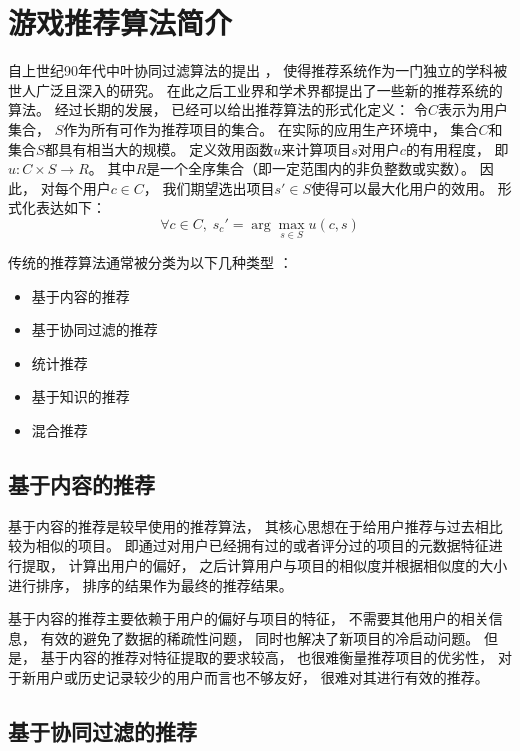 \section{游戏推荐算法简介}

自上世纪90年代中叶协同过滤算法的提出
\cite{adomaviciusNextGenerationRecommender2005}，
使得推荐系统作为一门独立的学科被世人广泛且深入的研究。
在此之后工业界和学术界都提出了一些新的推荐系统的算法。
经过长期的发展，
已经可以给出推荐算法的形式化定义：
令$C$表示为用户集合，
$S$作为所有可作为推荐项目的集合。
在实际的应用生产环境中，
集合$C$和集合$S$都具有相当大的规模。
定义效用函数$u$来计算项目$s$对用户$c$的有用程度，
即$u:C\times S\rightarrow R$。
其中$R$是一个全序集合（即一定范围内的非负整数或实数）。
因此，
对每个用户$c\in C$，
我们期望选出项目$s'\in S$使得可以最大化用户的效用。
形式化表达如下：
\begin{equation}
    \forall c\in C,\; s_c'=\arg \max_{s\in S} u(c,s)
\end{equation}

传统的推荐算法通常被分类为以下几种类型
\cite{canoHybridRecommenderSystems2017}：
\begin{itemize}
    \item 基于内容的推荐
    \item 基于协同过滤的推荐
    \item 统计推荐
    \item 基于知识的推荐
    \item 混合推荐
\end{itemize}

\subsection{基于内容的推荐}

基于内容的推荐是较早使用的推荐算法，
其核心思想在于给用户推荐与过去相比较为相似的项目。
即通过对用户已经拥有过的或者评分过的项目的元数据特征进行提取，
计算出用户的偏好，
之后计算用户与项目的相似度并根据相似度的大小进行排序，
排序的结果作为最终的推荐结果。

基于内容的推荐主要依赖于用户的偏好与项目的特征，
不需要其他用户的相关信息，
有效的避免了数据的稀疏性问题，
同时也解决了新项目的冷启动问题。
但是，
基于内容的推荐对特征提取的要求较高，
也很难衡量推荐项目的优劣性，
对于新用户或历史记录较少的用户而言也不够友好，
很难对其进行有效的推荐。

\subsection{基于协同过滤的推荐}

